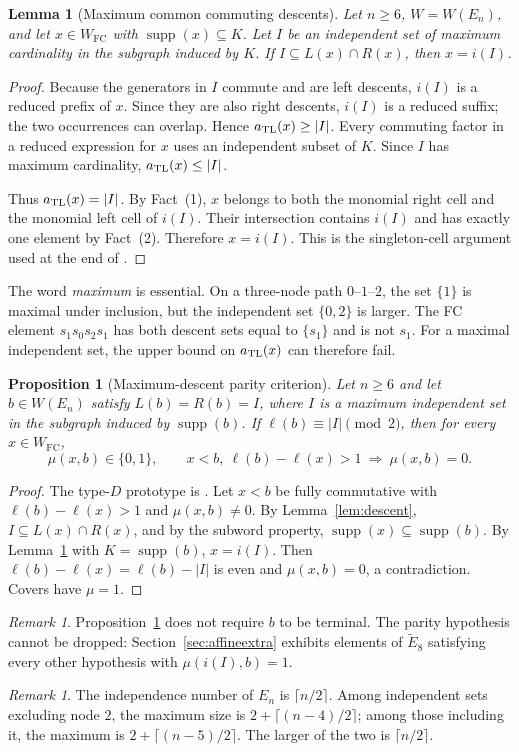 \documentclass[10pt]{article}
\newtheorem{lemma}[theorem]{Lemma}
\newtheorem{proposition}[theorem]{Proposition}
\theoremstyle{remark}
\newtheorem{remark}[theorem]{Remark}
\newcommand{\FC}{W_{\mathrm{FC}}}
\newcommand{\supp}{\operatorname{supp}}
\begin{document}
\begin{lemma}[Maximum common commuting descents]\label{lem:maxI}
Let $n\geq6$, $W=W(E_n)$, and let $x\in\FC$ with $\supp(x)\subseteq K$.
Let $I$ be an independent set of maximum cardinality in the subgraph
induced by $K$. If $I\subseteq L(x)\cap R(x)$, then $x=i(I)$.
\end{lemma}
\begin{proof}
Because the generators in $I$ commute and are left descents, $i(I)$ is
a reduced prefix of $x$. Since they are also right descents, $i(I)$ is
a reduced suffix; the two occurrences can overlap. Hence
$a_{\rm TL}(x)\geq|I|$. Every commuting factor in a reduced expression
for $x$ uses an independent subset of $K$. Since $I$ has maximum
cardinality, $a_{\rm TL}(x)\leq|I|$.

Thus $a_{\rm TL}(x)=|I|$. By Fact~(1), $x$ belongs to both the monomial
right cell and the monomial left cell of $i(I)$. Their intersection
contains $i(I)$ and has exactly one element by Fact~(2).
Therefore $x=i(I)$. This is the singleton-cell argument used at the end
of \cite[proof of Lemma~5.2]{GreenEn}.
\end{proof}

The word \emph{maximum} is essential. On a three-node path
$0\text{--}1\text{--}2$, the set $\{1\}$ is maximal under inclusion,
but the independent set $\{0,2\}$ is larger. The FC element
$s_1s_0s_2s_1$ has both descent sets equal to $\{s_1\}$ and is not $s_1$.
For a maximal independent set, the upper bound on $a_{\rm TL}(x)$ can therefore fail.

\begin{proposition}[Maximum-descent parity criterion]\label{prop:parity}
Let $n\geq6$ and let $b\in W(E_n)$ satisfy $L(b)=R(b)=I$, where $I$ is a
maximum independent set in the subgraph induced by $\supp(b)$. If
$\ell(b)\equiv|I|\pmod2$, then for every $x\in\FC$,
\[
 \mu(x,b)\in\{0,1\},\qquad
 x<b,\ \ell(b)-\ell(x)>1\ \Longrightarrow\ \mu(x,b)=0.
\]
\end{proposition}
\begin{proof}
The type-$D$ prototype is \cite[Lemmas~4.5.4 and 4.5.9]{Gern}. Let $x<b$
be fully commutative with $\ell(b)-\ell(x)>1$ and $\mu(x,b)\neq0$. By
Lemma~\ref{lem:descent}, $I\subseteq L(x)\cap R(x)$, and by the subword
property, $\supp(x)\subseteq\supp(b)$. By Lemma~\ref{lem:maxI} with
$K=\supp(b)$, $x=i(I)$. Then $\ell(b)-\ell(x)=\ell(b)-|I|$ is even
and $\mu(x,b)=0$, a contradiction. Covers have $\mu=1$.
\end{proof}
\begin{remark}\label{rem:parityremark}
Proposition~\ref{prop:parity} does not require $b$ to be terminal. The
parity hypothesis cannot be dropped: Section~\ref{sec:affineextra} exhibits
elements of $\widetilde E_8$ satisfying every other hypothesis with
$\mu(i(I),b)=1$.
\end{remark}
\begin{remark}\label{rem:indep}
The independence number of $E_n$ is $\lceil n/2\rceil$. Among independent
sets excluding node $2$, the maximum size is $2+\lceil(n-4)/2\rceil$;
among those including it, the maximum is $2+\lceil(n-5)/2\rceil$. The
larger of the two is $\lceil n/2\rceil$.
\end{remark}
\end{document}
